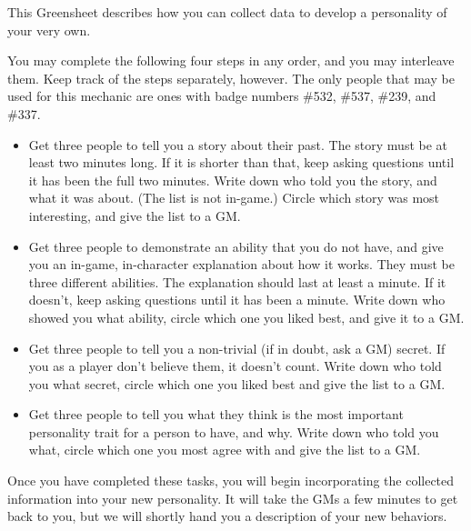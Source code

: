 \documentclass[green]{airship}
\begin{document}
\name{\gGrowup{}}

This Greensheet describes how you can collect data to develop a personality of your very own. 

You may complete the following four steps in any order, and you may interleave them. Keep track of the steps separately, however. The only people that may be used for this mechanic are ones with badge numbers \#532, \#537, \#239, and \#337.

\begin{itemize}
  \item Get three people to tell you a story about their past. The story must be at least two minutes long. If it is shorter than that, keep asking questions until it has been the full two minutes. Write down who told you the story, and what it was about. (The list is not in-game.) Circle which story was most interesting, and give the list to a GM. 
  \item Get three people to demonstrate an ability that you do not have, and give you an in-game, in-character explanation about how it works. They must be three different abilities. The explanation should last at least a minute. If it doesn't, keep asking questions until it has been a minute. Write down who showed you what ability, circle which one you liked best, and give it to a GM.
  \item Get three people to tell you a non-trivial (if in doubt, ask a GM)  secret. If you as a player don't believe them, it doesn't count. Write down who told you what secret, circle which one you liked best and give the list to a GM.
  \item Get three people to tell you what they think is the most important personality trait for a person to have, and why. Write down who told you what, circle which one you most agree with and give the list to a GM.
\end{itemize}

Once you have completed these tasks, you will begin incorporating the collected information into your new personality. It will take the GMs a few minutes to get back to you, but we will shortly hand you a description of your new behaviors.
\end{document}
